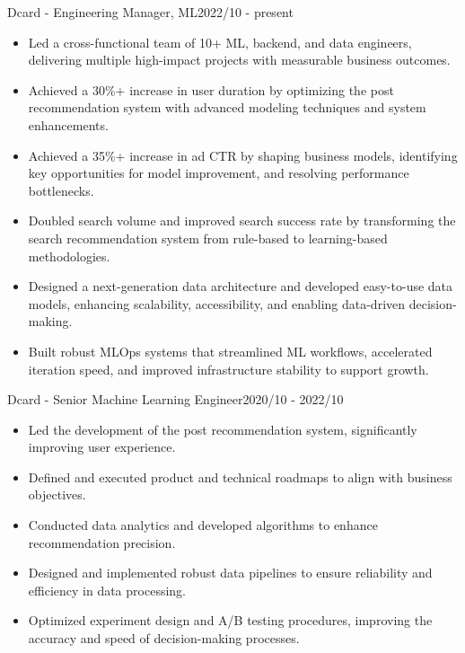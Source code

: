 \documentclass{joel_cv}
\begin{document}
\begin{cvHeader} 
\end{cvHeader}

%
%


\begin{profExp}
    {Dcard - Engineering Manager, ML}{2022/10 - present}{
        \begin{itemize}
            \item Led a cross-functional team of 10+ ML, backend, and data engineers, delivering multiple high-impact projects with measurable business outcomes.
            \item Achieved a 30\%+ increase in user duration by optimizing the post recommendation system with advanced modeling techniques and system enhancements.
            \item Achieved a 35\%+ increase in ad CTR by shaping business models, identifying key opportunities for model improvement, and resolving performance bottlenecks.
            \item Doubled search volume and improved search success rate by transforming the search recommendation system from rule-based to learning-based methodologies.
            \item Designed a next-generation data architecture and developed easy-to-use data models, enhancing scalability, accessibility, and enabling data-driven decision-making.
            \item Built robust MLOps systems that streamlined ML workflows, accelerated iteration speed, and improved infrastructure stability to support growth.
        \end{itemize}
    }
\end{profExp}

\begin{profExp}{Dcard - Senior Machine Learning Engineer}{2020/10 - 2022/10}{
        \begin{itemize}
            \item Led the development of the post recommendation system, significantly improving user experience.
            \item Defined and executed product and technical roadmaps to align with business objectives.
            \item Conducted data analytics and developed algorithms to enhance recommendation precision.
            \item Designed and implemented robust data pipelines to ensure reliability and efficiency in data processing.
            \item Optimized experiment design and A/B testing procedures, improving the accuracy and speed of decision-making processes.
        \end{itemize}
    }
\end{profExp}
\end{document}
